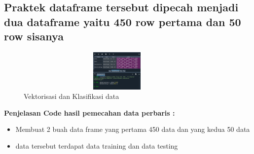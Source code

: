 \subsection{Praktek dataframe tersebut dipecah menjadi dua dataframe yaitu 450 row pertama dan 50 row sisanya}
\begin{figure}[!htbp]
	\centering
	\includegraphics[width=10cm,height=2cm]{figures/Cp4-2.png}
	\caption{Vektorisasi dan Klasifikasi data}
	\label{penanda}
\end{figure}
\textbf{Penjelasan Code hasil pemecahan data perbaris :}
\begin{itemize}
	\item Membuat 2 buah data frame yang pertama 450 data dan yang kedua 50 data
	\item data tersebut terdapat data training dan data testing
\end{itemize}

